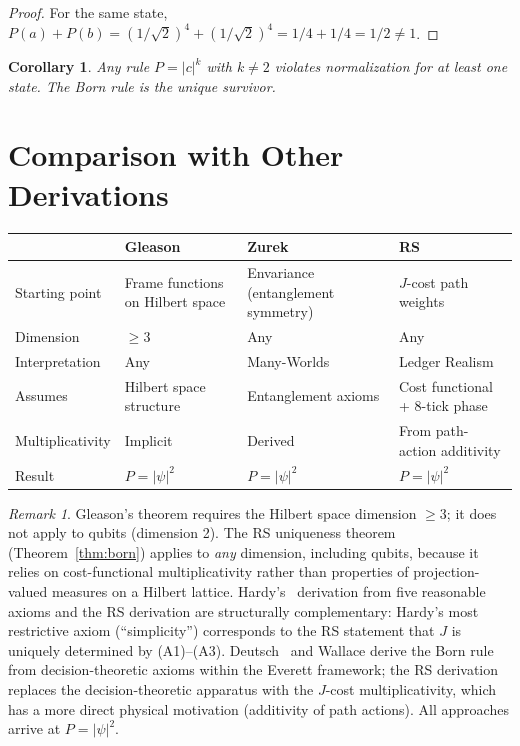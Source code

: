 \documentclass[12pt,a4paper]{article}
\newtheorem{corollary}[theorem]{Corollary}
\theoremstyle{definition}
\theoremstyle{remark}
\newtheorem{remark}[theorem]{Remark}
\begin{document}
\begin{proof}
For the same state,
$P(a) + P(b) = (1/\sqrt{2})^4 + (1/\sqrt{2})^4
= 1/4 + 1/4 = 1/2 \neq 1$.
\end{proof}

\begin{corollary}
Any rule $P = |c|^k$ with $k \neq 2$ violates normalization
for at least one state.  The Born rule is the unique survivor.
\end{corollary}

\section{Comparison with Other Derivations}
\label{sec:comparison}

\begin{center}
\renewcommand{\arraystretch}{1.3}
\begin{tabular}{lp{3cm}p{3cm}p{4.5cm}}
\toprule
& \textbf{Gleason} & \textbf{Zurek} & \textbf{RS} \\
\midrule
Starting point & Frame functions on Hilbert space
  & Envariance (entanglement symmetry)
  & $J$-cost path weights \\
Dimension & $\geq 3$ & Any & Any \\
Interpretation & Any & Many-Worlds & Ledger Realism \\
Assumes & Hilbert space structure & Entanglement axioms
  & Cost functional + 8-tick phase \\
Multiplicativity & Implicit & Derived & From path-action additivity \\
Result & $P = |\psi|^2$ & $P = |\psi|^2$ & $P = |\psi|^2$ \\
\bottomrule
\end{tabular}
\end{center}

\begin{remark}
Gleason's theorem requires the Hilbert space dimension $\geq 3$; it
does not apply to qubits (dimension 2).  The RS uniqueness theorem
(Theorem~\ref{thm:born}) applies to \emph{any} dimension, including
qubits, because it relies on cost-functional multiplicativity rather
than properties of projection-valued measures on a Hilbert lattice.
Hardy's~\cite{Hardy2001} derivation from five reasonable axioms and
the RS derivation are structurally complementary: Hardy's most
restrictive axiom (``simplicity'') corresponds to the RS statement
that $J$ is uniquely determined by (A1)--(A3).
Deutsch~\cite{Deutsch1999} and Wallace derive the Born rule
from decision-theoretic axioms within the Everett framework; the
RS derivation replaces the decision-theoretic apparatus with the
$J$-cost multiplicativity, which has a more direct physical
motivation (additivity of path actions).  All approaches arrive
at $P = |\psi|^2$.
\end{remark}
\end{document}
